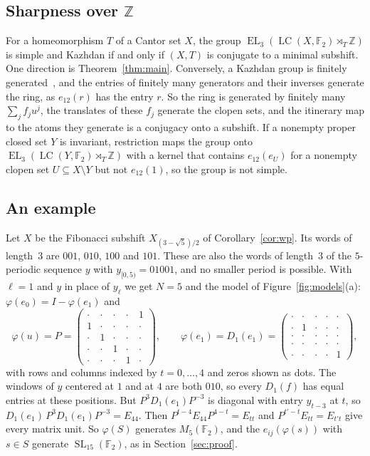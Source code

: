 \documentclass[11pt]{amsart}
\newcommand{\F}{\mathbb F}
\newcommand{\Z}{\mathbb Z}
\newcommand{\LC}{\operatorname{LC}}
\newcommand{\EL}{\operatorname{EL}}
\newcommand{\SL}{\operatorname{SL}}
\begin{document}
\subsection*{Sharpness over $\Z$}
For a homeomorphism $T$ of a Cantor set $X$, the group
$\EL_3(\LC(X,\F_2)\rtimes_T\Z)$ is simple and Kazhdan if and only if
$(X,T)$ is conjugate to a minimal subshift. One direction is
Theorem~\ref{thm:main}. Conversely, a Kazhdan group is finitely
generated~\cite[Theorem~1.3.1]{BHV}, and the entries of finitely many
generators and their inverses generate the ring, as $e_{12}(r)$ has the
entry $r$. So the ring is generated by finitely many $\sum_jf_ju^j$, the
translates of these $f_j$ generate the clopen sets, and the itinerary map
to the atoms they generate is a conjugacy onto a subshift. If a nonempty
proper closed set $Y$ is invariant, restriction maps the group onto
$\EL_3(\LC(Y,\F_2)\rtimes_T\Z)$ with a kernel that contains $e_{12}(e_U)$
for a nonempty clopen set $U\subseteq X\setminus Y$ but not $e_{12}(1)$,
so the group is not simple.

\subsection*{An example}
Let $X$ be the Fibonacci subshift $X_{(3-\sqrt5)/2}$ of
Corollary~\ref{cor:wp}. Its words of length~$3$ are $001$, $010$, $100$
and $101$. These are also the words of length~$3$ of the $5$-periodic
sequence $y$ with $y_{[0,5)}=01001$, and no smaller period is possible.
With $\ell=1$ and $y$ in place of $y_\ell$ we get $N=5$ and the model of
Figure~\ref{fig:models}(a): $\varphi(e_0)=I-\varphi(e_1)$ and
\[
  \varphi(u)=P=
  \begin{pmatrix}
  \cdot&\cdot&\cdot&\cdot&1\\
  1&\cdot&\cdot&\cdot&\cdot\\
  \cdot&1&\cdot&\cdot&\cdot\\
  \cdot&\cdot&1&\cdot&\cdot\\
  \cdot&\cdot&\cdot&1&\cdot
  \end{pmatrix},\qquad
  \varphi(e_1)=D_1(e_1)=
  \begin{pmatrix}
  \cdot&\cdot&\cdot&\cdot&\cdot\\
  \cdot&1&\cdot&\cdot&\cdot\\
  \cdot&\cdot&\cdot&\cdot&\cdot\\
  \cdot&\cdot&\cdot&\cdot&\cdot\\
  \cdot&\cdot&\cdot&\cdot&1
  \end{pmatrix},
\]
with rows and columns indexed by $t=0,\dots,4$ and zeros shown as dots.
The windows of $y$ centered at $1$ and at $4$ are both $010$, so every
$D_1(f)$ has equal entries at these positions. But $P^3D_1(e_1)P^{-3}$ is
diagonal with entry $y_{t-3}$ at $t$, so
$D_1(e_1)\,P^3D_1(e_1)P^{-3}=E_{44}$. Then $P^{t-4}E_{44}P^{4-t}=E_{tt}$
and $P^{t'-t}E_{tt}=E_{t't}$ give every matrix unit. So $\varphi(S)$
generates $M_5(\F_2)$, and the $e_{ij}(\varphi(s))$ with $s\in S$ generate
$\SL_{15}(\F_2)$, as in Section~\ref{sec:proof}.
\end{document}
